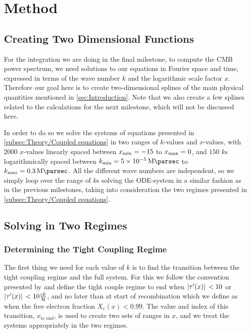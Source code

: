 \documentclass[10pt,a4paper]{article}
\begin{document}
\section{Method}
\label{sec:Method}

\subsection{Creating Two Dimensional Functions}
\label{subsec:Method/2D functions}
For the integration we are doing in the final milestone, to compute the CMB power spectrum, we need solutions to our equations in Fourier space and time, expressed in terms of the wave number $k$ and the logarithmic scale factor $x$. Therefore our goal here is to create two-dimensional splines of the main physical quantities mentioned in \cref{sec:Introduction}. Note that we also create a few splines related to the calculations for the next milestone, which will not be discussed here.

In order to do so we solve the systems of equations presented in \cref{subsec:Theory/Coupled equations} in two ranges of $k$-values and $x$-values, with $2000$ $x$-values linearly spaced between $x_{\rm{min}} = -15$ to $x_{\rm{max}}=0$, and $150$ $k$s logarithmically spaced between $k_{\rm{min}} = \SI{5e-5}{\per\mega\parsec}$ to $k_{\rm{max}} = \SI{0.3}{\per\mega\parsec}$. All the different wave numbers are independent, so we simply loop over the range of $k$s solving the ODE-system in a similar fashion as in the previous milestones, taking into consideration the two regimes presented in \cref{subsec:Theory/Coupled equations}.

\subsection{Solving in Two Regimes}
\label{subsec:Method/Solving in two regimes}

\subsubsection{Determining the Tight Coupling Regime}
\label{subsubsec:Method/Determine TC}
The first thing we need for each value of $k$ is to find the transition between the tight coupling regime and the full system. For this we follow the convention presented by \cite{Calin} and define the tight couple regime to end when $\abs*{\tau^\prime(x)}<10$ or $\abs*{\tau^\prime(x)}<10\frac{ck}{\mathcal{H}}$, and no later than at start of recombination which we define as when the free electron fraction $X_e(x) < 0.99$. The value and index of this transition, $x_{\textrm{tc end}}$, is used to create two sets of ranges in $x$, and we treat the systems appropriately in the two regimes.
\end{document}
